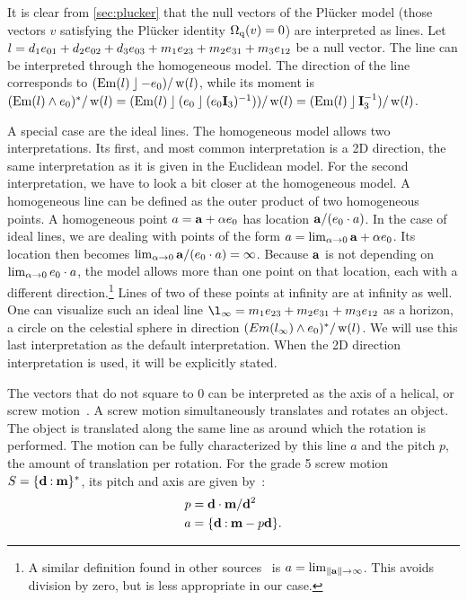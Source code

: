 It is clear from \autoref{sec:plucker} that the null vectors of the Pl\"ucker model (those vectors $v$ satisfying the Pl\"ucker identity $\operatorname{\Omega_q}(v) = 0$) are interpreted as lines.  Let $l = d_1 e_{01} + d_2 e_{02} + d_3 e_{03} + m_1 e_{23} + m_2 e_{31} + m_3 e_{12}$ be a null vector.  The line can be interpreted through the homogeneous model.  The direction of the line corresponds to $(\operatorname{Em}(l) \mathbin{\rfloor} -e_0) / \operatorname{w}(l)$, while its moment is $(\operatorname{Em}(l) \wedge e_0)^\ast / \operatorname{w}(l) = (\operatorname{Em}(l) \mathbin{\rfloor} (e_0 \mathbin{\rfloor} (e_0\mathbf{I}_3)^{-1})) / \operatorname{w}(l) = (\operatorname{Em}(l) \mathbin{\rfloor} \mathbf{I}_3^{-1}) / \operatorname{w}(l)$.  

A special case are the ideal lines.  The homogeneous model allows two interpretations.  Its first, and most common interpretation is a 2D direction, the same interpretation as it is given in the Euclidean model.  For the second interpretation, we have to look a bit closer at the homogeneous model.  A homogeneous line can be defined as the outer product of two homogeneous points.  A homogeneous point $a = \mathbf{a} + \alpha e_0$ has location $\mathbf{a} / (e_0 \mathbin{\cdot} a)$.  In the case of ideal lines, we are dealing with points of the form $a = \lim_{\alpha \to 0} \mathbf{a} + \alpha e_0$.  Its location then becomes $\lim_{\alpha \to 0} \mathbf{a} / (e_0 \mathbin{\cdot} a) = \infty$.  Because $\mathbf{a}$ is not depending on $\lim_{\alpha \to 0} e_0 \mathbin{\cdot} a$, the model allows more than one point on that location, each with a different direction.\footnote{A similar definition found in other sources~\cite[Section 11.3]{TheBook} is $a = \lim_{\left\|\mathbf{a}\right\| \to \infty}$.  This avoids division by zero, but is less appropriate in our case.}  Lines of two of these points at infinity are at infinity as well.  One can visualize such an ideal line $\l_\infty = m_1 \etd + m_2 \ede + m_3 \eet$ as a horizon, a circle on the celestial sphere in direction $(Em(l_\infty) \wedge e_0)^\ast / \operatorname{w}(l)$.  We will use this last interpretation as the default interpretation.  When the 2D direction interpretation is used, it will be explicitly stated.

The vectors that do not square to $0$ can be interpreted as the axis of a helical, or screw motion~\cite[Section 3.1.2]{Pottmann}.  A screw motion simultaneously translates and rotates an object.  The object is translated along the same line as around which the rotation is performed.  The motion can be fully characterized by this line $a$ and the pitch $p$, the amount of translation per rotation.  For the grade 5 screw motion $S = \{\mathbf{d} \mathbin{:} \mathbf{m}\}^\ast$, its pitch and axis are given by~\cite[Theorem 3.1.9]{Pottmann}:
\begin{align}
  \label{eq:screwparams}
  p &= \mathbf{d} \mathbin{\cdot} \mathbf{m} / \mathbf{d}^2 \nonumber \\
  a &= \{\mathbf{d} \mathbin{:} \mathbf{m} - p \mathbf{d}\} .
\end{align}

